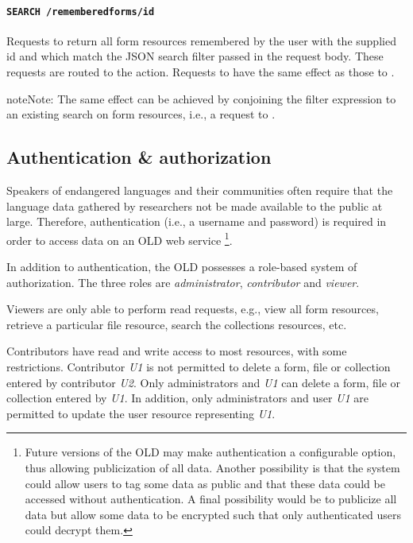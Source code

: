 \documentclass[letterpaper,10pt,english]{sphinxmanual}
\begin{document}
\paragraph{\texttt{SEARCH /rememberedforms/id}}
\label{interface:search-rememberedforms-id}
Requests to  return all form resources remembered
by the user with the supplied id and which match the JSON search filter passed
in the request body.  These requests are routed to the  action.
Requests to  have the same effect as those to
.

\begin{notice}{note}{Note:}
The same effect can be achieved by conjoining the filter expression
\code{{[}"Memorizer", "id", "=", id{]}} to an existing search on form resources,
i.e., a request to .
\end{notice}


\subsection{Authentication \& authorization}
\label{interface:authentication-authorization}\label{interface:auth}
Speakers of endangered languages and their communities often require that the
language data gathered by researchers not be made available to the public at
large.  Therefore, authentication (i.e., a username and password) is required in
order to access data on an OLD web service \footnote{
Future versions of the OLD may make authentication a configurable
option, thus allowing publicization of all data.  Another possibility is that
the system could allow users to tag some data as public and that these data
could be accessed without authentication.  A final possibility would be to
publicize all data but allow some data to be encrypted such that only
authenticated users could decrypt them.
}.

In addition to authentication, the OLD possesses a role-based system of
authorization.  The three roles are \emph{administrator}, \emph{contributor} and \emph{viewer}.

Viewers are only able to perform read requests, e.g., view all form resources,
retrieve a particular file resource, search the collections resources, etc.

Contributors have read and write access to most resources, with some
restrictions.  Contributor \emph{U1} is not permitted to delete a form, file or
collection entered by contributor \emph{U2}.  Only administrators and \emph{U1} can delete
a form, file or collection entered by \emph{U1}.  In addition, only administrators
and user \emph{U1} are permitted to update the user resource representing \emph{U1}.
\end{document}
